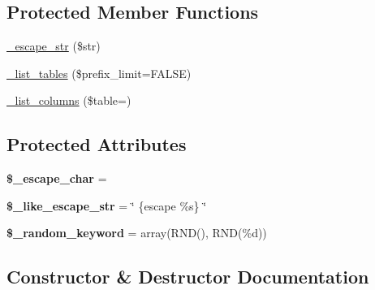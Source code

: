 \subsection*{Protected Member Functions}
\begin{DoxyCompactItemize}
\item 
\mbox{\hyperlink{class_c_i___d_b__pdo__odbc__driver_a1cab1022ffa6703fea41afce5f4251ae}{\+\_\+escape\+\_\+str}} (\$str)
\item 
\mbox{\hyperlink{class_c_i___d_b__pdo__odbc__driver_a28ecbc447e1bb596bd6467d4d7687900}{\+\_\+list\+\_\+tables}} (\$prefix\+\_\+limit=F\+A\+L\+SE)
\item 
\mbox{\hyperlink{class_c_i___d_b__pdo__odbc__driver_aab84b252b1074b3090c726736582d00c}{\+\_\+list\+\_\+columns}} (\$table=\textquotesingle{}\textquotesingle{})
\end{DoxyCompactItemize}
\subsection*{Protected Attributes}
\begin{DoxyCompactItemize}
\item 
\mbox{\label{class_c_i___d_b__pdo__odbc__driver_ad3317ee445b6e50bc48dc303c8ee9eb6}} 
{\bfseries \$\+\_\+escape\+\_\+char} = \textquotesingle{}\textquotesingle{}
\item 
\mbox{\label{class_c_i___d_b__pdo__odbc__driver_ad35f2a8ae2c28b648f29a12fbd5696a2}} 
{\bfseries \$\+\_\+like\+\_\+escape\+\_\+str} = \char`\"{} \{escape \textquotesingle{}\%s\textquotesingle{}\} \char`\"{}
\item 
\mbox{\label{class_c_i___d_b__pdo__odbc__driver_ab0952fb61d9668b0c2daa407f3f5e5fe}} 
{\bfseries \$\+\_\+random\+\_\+keyword} = array(\textquotesingle{}R\+ND()\textquotesingle{}, \textquotesingle{}R\+ND(\%d)\textquotesingle{})
\end{DoxyCompactItemize}


\subsection{Constructor \& Destructor Documentation}
\mbox{\label{class_c_i___d_b__pdo__odbc__driver_ab9b440e8235b717b5fb073773782e7bc}} 
